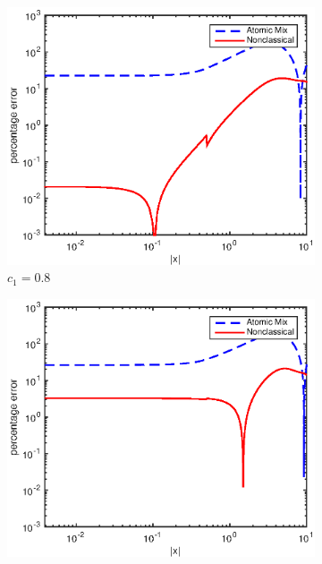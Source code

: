 \documentclass[12pt]{article}
\begin{document}
{\begin{figure}[p]
\begin{subfigure}{0.495\textwidth}
        \label{figerrD70}
    \end{subfigure}
    \\
    \centering
    \begin{subfigure}{0.495\textwidth}
        \centering
        \includegraphics[width=\textwidth]{NSE_err_D80.eps}
        \caption{$c_1 = 0.8$}
        \label{figerrD80}
    \end{subfigure}
    \hfill
    \begin{subfigure}{0.495\textwidth}
        \centering
        \includegraphics[width=\textwidth]{NSE_err_D90.eps}

\end{subfigure}
\end{figure}}
\end{document}
